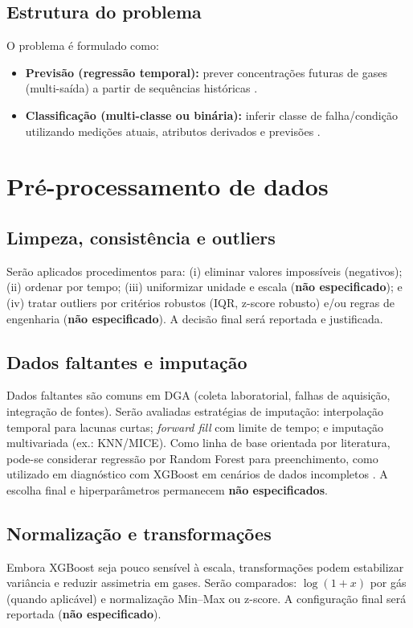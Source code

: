 \subsection{Estrutura do problema}
O problema é formulado como:
\begin{itemize}
\item \textbf{Previsão (regressão temporal):} prever concentrações futuras de gases (multi-saída) a partir de sequências históricas
\cite{wang2023_lstm_dga}.
\item \textbf{Classificação (multi-classe ou binária):} inferir
classe de falha/condição utilizando medições atuais, atributos
derivados e previsões \cite{wu2021_iga_xgboost}.
\end{itemize}

\section{Pré-processamento de dados}
\subsection{Limpeza, consistência e outliers}
Serão aplicados procedimentos para:
(i) eliminar valores impossíveis (negativos); (ii) ordenar por tempo; (iii) uniformizar unidade e escala (\textbf{não especificado}); e
(iv) tratar outliers por critérios robustos (IQR, z-score robusto) e/ou
regras de engenharia (\textbf{não especificado}).
A decisão final será reportada e justificada.

\subsection{Dados faltantes e imputação}
Dados faltantes são comuns em DGA (coleta laboratorial, falhas de
aquisição, integração de fontes).
Serão avaliadas estratégias de imputação:
interpolação temporal para lacunas curtas; \textit{forward fill} com
limite de tempo; e imputação multivariada (ex.: KNN/MICE).
Como linha de base orientada por literatura, pode-se considerar regressão
por Random Forest para preenchimento, como utilizado em diagnóstico com
XGBoost em cenários de dados incompletos
\cite{wang2023_tpe_xgboost_incomplete}.
A escolha final e hiperparâmetros permanecem \textbf{não especificados}.

\subsection{Normalização e transformações}
Embora XGBoost seja pouco sensível à escala, transformações podem
estabilizar variância e reduzir assimetria em gases.
Serão comparados:
$\log(1+x)$ por gás (quando aplicável) e normalização Min--Max ou z-score.
A configuração final será reportada (\textbf{não especificado}).

